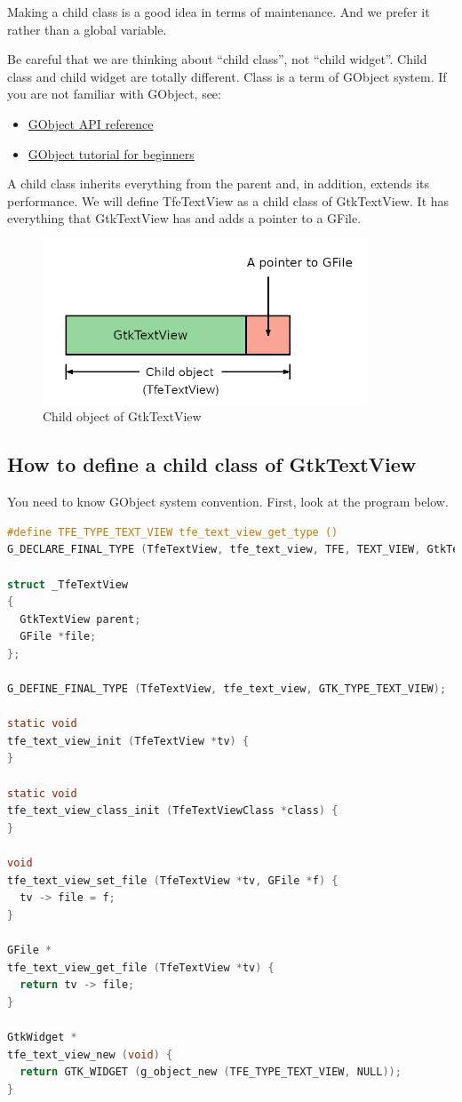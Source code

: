 Making a child class is a good idea in terms of maintenance. And we
prefer it rather than a global variable.

Be careful that we are thinking about ``child class'', not ``child
widget''. Child class and child widget are totally different. Class is a
term of GObject system. If you are not familiar with GObject, see:

\begin{itemize}
\tightlist
\item
  \href{https://docs.gtk.org/gobject/}{GObject API reference}
\item
  \href{https://toshiocp.github.io/Gobject-tutorial/}{GObject tutorial
  for beginners}
\end{itemize}

A child class inherits everything from the parent and, in addition,
extends its performance. We will define TfeTextView as a child class of
GtkTextView. It has everything that GtkTextView has and adds a pointer
to a GFile.

\begin{figure}
\centering
\includegraphics[width=9.675cm,height=4.89cm]{../image/child.png}
\caption{Child object of GtkTextView}
\end{figure}

\subsection{How to define a child class of
GtkTextView}\label{how-to-define-a-child-class-of-gtktextview}

You need to know GObject system convention. First, look at the program
below.

\begin{lstlisting}[language=C]
#define TFE_TYPE_TEXT_VIEW tfe_text_view_get_type ()
G_DECLARE_FINAL_TYPE (TfeTextView, tfe_text_view, TFE, TEXT_VIEW, GtkTextView)

struct _TfeTextView
{
  GtkTextView parent;
  GFile *file;
};

G_DEFINE_FINAL_TYPE (TfeTextView, tfe_text_view, GTK_TYPE_TEXT_VIEW);

static void
tfe_text_view_init (TfeTextView *tv) {
}

static void
tfe_text_view_class_init (TfeTextViewClass *class) {
}

void
tfe_text_view_set_file (TfeTextView *tv, GFile *f) {
  tv -> file = f;
}

GFile *
tfe_text_view_get_file (TfeTextView *tv) {
  return tv -> file;
}

GtkWidget *
tfe_text_view_new (void) {
  return GTK_WIDGET (g_object_new (TFE_TYPE_TEXT_VIEW, NULL));
}
\end{lstlisting}

